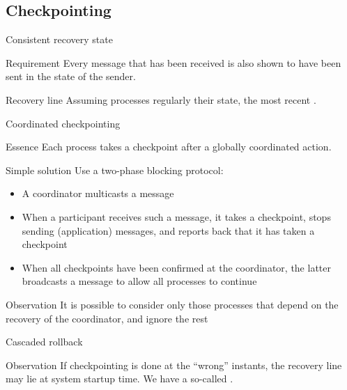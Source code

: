 \subsection{Checkpointing}
\begin{slide}{Consistent recovery state}
  \begin{alertblock}{Requirement} 
    Every message that has been received is also shown to have been sent in the state of the sender.
  \end{alertblock}
  \begin{block}{Recovery line} 
    Assuming processes regularly  their state, the most recent .
  \end{block}
  \begin{centerfig}
  \end{centerfig}
\end{slide}
\begin{slide}{Coordinated checkpointing}
  \begin{block}{Essence} 
    Each process takes a checkpoint after a globally coordinated action.
  \end{block}
  \begin{block}{Simple solution}
    Use a two-phase blocking protocol:
    \begin{itemize}\tightlist
    \item<2-> A coordinator multicasts a  message
    \item<3-> When a participant receives such a message, it takes a checkpoint, stops sending (application)
      messages, and reports back that it has taken a checkpoint
    \item<4-> When all checkpoints have been confirmed at the coordinator, the latter broadcasts a
       message to allow all processes to continue
    \end{itemize}
  \end{block}
  \begin{block}{Observation} 
    It is possible to consider only those processes that depend on the recovery of the coordinator, and ignore
    the rest
  \end{block}
\end{slide}
\begin{slide}{Cascaded rollback}
  \begin{block}{Observation} 
    If checkpointing is done at the ``wrong'' instants, the recovery line may lie at system startup time. We
    have a so-called .
  \end{block}
  \begin{centerfig}
  \end{centerfig}
\end{slide}
